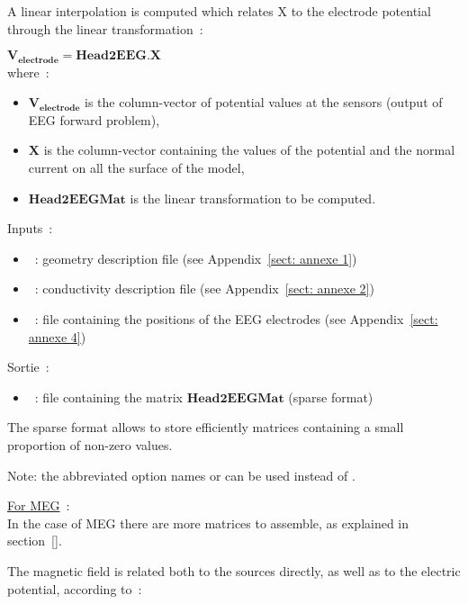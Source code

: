 A linear interpolation is computed which relates X to the electrode potential through the linear transformation~:
\medskip

\noindent
 $\mathbf{V_{electrode}} = \mathbf{Head2EEG} . \mathbf{X}$\\
where~:\\ 
\begin{itemize}
    \item $\mathbf{V_{electrode}}$ is the column-vector of potential values at the sensors (output of EEG forward problem),
    \item $\mathbf{X}$ is the column-vector containing the values of the potential and the normal current on all the surface of the model,
    \item $\mathbf{Head2EEGMat}$ is the linear transformation to be computed.
\end{itemize}

\bigskip

\noindent
Inputs~:
\begin{itemize}
    \item {}~: geometry description file (see Appendix~\ref{sect: annexe 1})
    \item {}~: conductivity description file (see Appendix~\ref{sect: annexe 2})
    \item {}~: file containing the positions of the EEG electrodes (see Appendix~\ref{sect: annexe 4})
\end{itemize}
Sortie~:
\begin{itemize}
    \item {}~: file containing the matrix $\mathbf{Head2EEGMat}$ (sparse format)
\end{itemize}
The sparse format allows to store efficiently matrices containing a small proportion of non-zero values.
\medskip

\noindent
{}
\medskip
Note: the abbreviated option names  or  can be used instead of .

\bigskip

\checkItem \underline{For MEG}~:\\
In the case of MEG there are more matrices to assemble, as explained in section~\ref{}.

The magnetic field is related both to the sources directly, as well as to the electric  potential, according to~:

